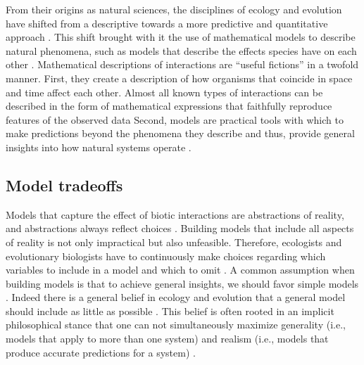 \documentclass[12pt]{article}
\begin{document}
From their origins as natural sciences, the disciplines of ecology and evolution have shifted from a descriptive towards a more predictive and quantitative approach \citep{holling1966strategy,pickett1980non,simberloff2004community,marquet2014theory,lassig2017predicting,rossberg2019let}. This shift brought with it the use of mathematical models to describe natural phenomena, such as models that describe the effects species have on each other \citep{holling1966strategy,levins1966strategy,maynard1978models,servedio2014not}. Mathematical descriptions of interactions are ``useful fictions'' \citep{box2011statistical} in a twofold manner. First, they create a description of how organisms that coincide in space and time affect each other. Almost all known types of interactions can be described in the form of mathematical expressions that faithfully reproduce features of the observed data \citep{volterra1926fluctuations,holling1959some,holt1977predation,adler2018competition,wood1999super,holland2002population,vazquez2005interaction,stouffer2021hidden}  Second, models are practical tools with which to make predictions beyond the phenomena they describe and thus, provide general insights into how natural systems operate \citep{sutherland2006predicting,stouffer2019all}.



\subsection*{Model tradeoffs}
Models that capture the effect of biotic interactions are abstractions of reality, and abstractions always reflect choices \citep{levins2006strategies}. Building models that include all aspects of reality is not only impractical but also unfeasible.  Therefore, ecologists and evolutionary biologists have to continuously make choices regarding which variables to include in a model and which to omit \citep{odenbaugh2005idealized}. A common assumption when building models is that to achieve general insights, we should favor simple models \citep{evans2013simple}. Indeed there is a general belief in ecology and evolution that a general model should include as little as possible \citep{holling1966strategy,may2019stability,roughgarden2018adaptive}. This belief is often rooted in an implicit philosophical stance that one can not simultaneously maximize generality (i.e., models that apply to more than one system) and realism (i.e., models that produce accurate predictions for a system) \citep{levins1966strategy,levins1993response}.
\end{document}
